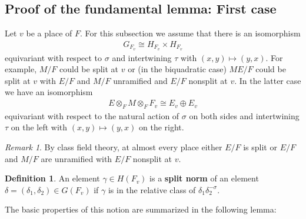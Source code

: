 \documentclass[12pt]{amsart}
\theoremstyle{remark}
\newtheorem*{rem}{Remark}
\numberwithin{equation}{section}
\theoremstyle{definition}
\newtheorem{defn}[thm]{Definition}
\numberwithin{equation}{subsection}
\begin{document}

\subsection{Proof of the fundamental lemma: First case}

\label{ssec-fl-first-case}

Let $v$ be a place of $F$.  For this subsection we assume that there is an isomorphism
\begin{align} \label{H-spl-isom}
G_{F_v} \cong H_{F_v} \times H_{F_v}
\end{align}
equivariant with respect to $\sigma$ and intertwining $\tau$ with $(x,y) \mapsto (y,x)$.  For example, $M/F$ could be split at $v$ or (in the biquadratic case)
$ME/F$ could be split at $v$ with $E/F$ and $M/F$ unramified and $E/F$ nonsplit at $v$. In the latter case we have an isomorphism
\begin{align} \label{ek-spl-isom}
E \otimes_F M \otimes_F F_v \cong E_v \oplus E_{v}
\end{align}
equivariant with respect to the natural action of $\sigma$ on both sides and intertwining $\tau$ on the left with
$(x,y) \mapsto (y,x)$ on the right.

\begin{rem} By class field theory, at almost every place either $E/F$ is split or $E/F$ and $M/F$ are unramified with $E/F$ nonsplit at $v$.
\end{rem}

\begin{defn}
An element $\gamma \in H(F_v)$ is a \textbf{split norm} of an element $\delta=(\delta_1,\delta_2) \in G(F_v)$
if $\gamma$ is in the relative class of $\delta_1\delta_2^{-\sigma}$.
\end{defn}

The basic properties of this notion are summarized in the following lemma:
\end{document}
